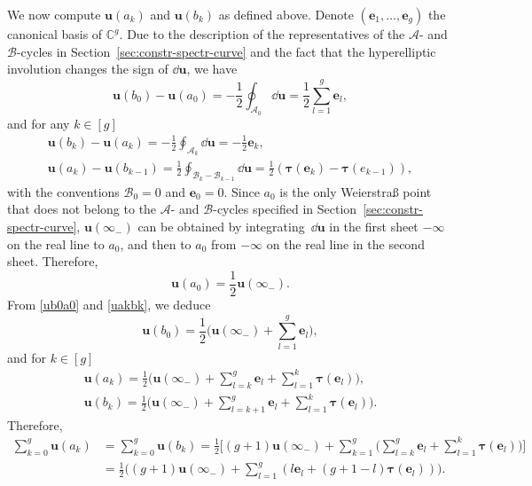 \documentclass[pdftex]{sigma}
\numberwithin{equation}{section}
\begin{document}
We now compute $\bm{u}(a_k)$ and $\bm{u}(b_k)$ as defined above. Denote $(\bm{e}_1,\ldots,\bm{e}_g)$ the canonical basis of $\mathbb{C}^g$. Due to the description of the representatives of the $\mathcal{A}$- and $\mathcal{B}$-cycles in Section~\ref{sec:constr-spectr-curve} and the fact that the hyperelliptic involution changes the sign of $\dd \bm{u}$, we have
\begin{equation}
\label{ub0a0}
\bm{u}(b_0) - \bm{u}(a_0) = - \frac{1}{2} \oint_{\mathcal{A}_0} \dd \bm{u} = \frac{1}{2} \sum_{l = 1}^{g} \bm{e}_l,
\end{equation}
and for any $k \in [g]$
\begin{gather}
\bm{u}(b_k) - \bm{u}(a_k)  = - \frac{1}{2} \oint_{\mathcal{A}_k} \dd \bm{u} = -\frac{1}{2}\bm{e}_k, \nonumber\\
\bm{u}(a_k) - \bm{u}(b_{k - 1})  = \frac{1}{2} \oint_{\mathcal{B}_{k} - \mathcal{B}_{k - 1}} \dd \bm{u} = \frac{1}{2} (\bm{\tau}(\bm{e}_k) - \bm{\tau}(e_{k - 1})), \label{uakbk}
\end{gather}
with the conventions $\mathcal{B}_0 = 0$ and $\bm{e}_0 = 0$. Since $a_0$ is the only Weierstra\ss{} point that does not belong to the $\mathcal{A}$- and $\mathcal{B}$-cycles specified in Section~\ref{sec:constr-spectr-curve}, $\bm{u}(\infty_-)$ can be obtained by integrating~$\dd \bm{u}$ in the first sheet $-\infty$ on the real line to $a_0$, and then to $a_0$ from $-\infty$ on the real line in the second sheet. Therefore,
\[
\bm{u}(a_0) = \frac{1}{2} \bm{u}(\infty_-).
\]
From \eqref{ub0a0} and \eqref{uakbk}, we deduce
\[
\bm{u}(b_0) = \frac{1}{2}\Biggl(\bm{u}(\infty_-) + \sum_{l = 1}^g \bm{e}_l\Biggr),
\]
and for $k \in [g]$
\begin{gather*}
\bm{u}(a_k) = \frac{1}{2}\Biggl(\bm{u}(\infty_-) + \sum_{l = k}^{g} \bm{e}_l + \sum_{l = 1}^{k} \bm{\tau}(\bm{e}_l)\Biggr), \\
\bm{u}(b_k) = \frac{1}{2}\Biggl(\bm{u}(\infty_-) + \sum_{l= k + 1}^{g} \bm{e}_l + \sum_{l = 1}^{k} \bm{\tau}(\bm{e}_l)\Biggr).
\end{gather*}
Therefore,
\begin{align*}
\sum_{k = 0}^{g} \bm{u}(a_k) &{} = \sum_{k = 0}^{g} \bm{u}(b_k) = \frac{1}{2}\Biggl[(g + 1)\bm{u}(\infty_-) + \sum_{k = 1}^{g}\Biggl( \sum_{l = k}^{g} \bm{e}_l + \sum_{l = 1}^k \bm{\tau}(\bm{e}_l)\Biggr)\Biggr] \\
 &{} = \frac{1}{2}\Biggl((g + 1)\bm{u}(\infty_-) + \sum_{l = 1}^{g} (l \bm{e}_l + (g + 1 -l)\bm{\tau}(\bm{e}_l))\Biggr).
\end{align*}
\end{document}
